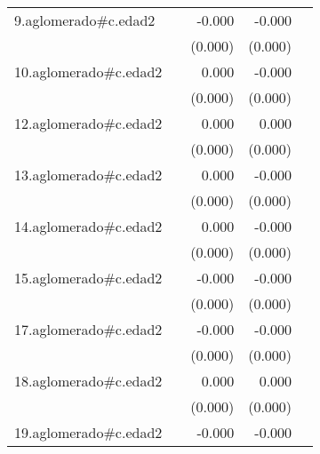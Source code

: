{\begin{longtable}{l*{4}{D{.}{.}{-1}}}
\addlinespace
9.aglomerado#c.edad2&                     &      -0.000\sym{*}  &      -0.000\sym{***}&                     \\
            &                     &     (0.000)         &     (0.000)         &                     \\
\addlinespace
10.aglomerado#c.edad2&                     &       0.000         &      -0.000         &                     \\
            &                     &     (0.000)         &     (0.000)         &                     \\
\addlinespace
12.aglomerado#c.edad2&                     &       0.000         &       0.000         &                     \\
            &                     &     (0.000)         &     (0.000)         &                     \\
\addlinespace
13.aglomerado#c.edad2&                     &       0.000         &      -0.000         &                     \\
            &                     &     (0.000)         &     (0.000)         &                     \\
\addlinespace
14.aglomerado#c.edad2&                     &       0.000         &      -0.000\sym{*}  &                     \\
            &                     &     (0.000)         &     (0.000)         &                     \\
\addlinespace
15.aglomerado#c.edad2&                     &      -0.000         &      -0.000         &                     \\
            &                     &     (0.000)         &     (0.000)         &                     \\
\addlinespace
17.aglomerado#c.edad2&                     &      -0.000         &      -0.000         &                     \\
            &                     &     (0.000)         &     (0.000)         &                     \\
\addlinespace
18.aglomerado#c.edad2&                     &       0.000         &       0.000         &                     \\
            &                     &     (0.000)         &     (0.000)         &                     \\
\addlinespace
19.aglomerado#c.edad2&                     &      -0.000         &      -0.000         &                     \\

\end{longtable}}
